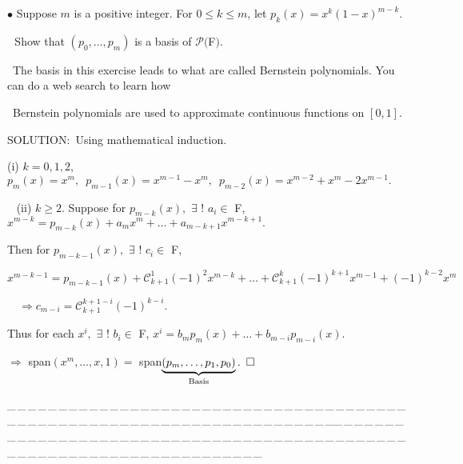 \documentclass[a4paper, 11pt, UTF8]{article}
\def\Po{\mathcal{P}}
\begin{document}
\begin{large}
{\small $\bullet$} {\timessl\Large 
Suppose $m$ is a positive integer. For $0\leq k\leq m$, let $p_k(x)=x^k(1-x)^{m-k}$.}\par\,\,
{\timessl\Large Show that $(p_0,\dots,p_m)$ is a basis of $\Po(${\timesbf F}$)$.}\par\quad\,
{\timessl\small
The basis in this exercise leads to what are called Bernstein polynomials. You can do a web search to learn how}\par\quad\,
{\timessl\small Bernstein polynomials are used to approximate continuous functions on $[0, 1]$.}\par
{\timesbf S\footnotesize{OLUTION:}}\,\,\,Using mathematical induction.\Large\par\quad
(i) $k=0,1,2$, $p_m(x)=x^m,\,\,\,p_{m-1}(x)=x^{m-1}-x^m,\,\,\,p_{m-2}(x)=x^{m-2}+x^m-2x^{m-1}.$\par\,\,\,
(ii) $k\geq 2.$ Suppose for $p_{m-k}(x),\,\,\exists\,\,!\,\,a_i\in$ {\timesbf F}, $x^{m-k}=p_{m-k}(x)+a_m x^m+\dots+a_{m-k+1}x^{m-k+1}.$\par\qquad
Then for $p_{m-k-1}(x),\,\,\exists\,\,!\,\,c_i\in$ {\timesbf F},\par\qquad\qquad
$x^{m-k-1}=p_{m-k-1}(x)+\mathcal{C}_{k+1}^1(-1)^2 x^{m-k}+\dots+\mathcal{C}_{k+1}^k(-1)^{k+1}x^{m-1}+(-1)^{k-2}x^m$\par\qquad\quad\,\,\,\,
$\Rightarrow c_{m-i}=\mathcal{C}_{k+1}^{k+1-i}(-1)^{k-i}$.\par\qquad
Thus for each $x^i,\,\,\exists\,\,!\,\,b_i\in$ {\timesbf F}, $x^i=b_m p_m(x)+\dots+b_{m-i}p_{m-i}(x)$.\par\quad
$\Rightarrow$ span$(x^m,\dots,x,1)=$ span$\underbrace{(p_m,\dots,p_1,p_0)}_\textup{Basis}.\,\,\,\square$
\par\large
{\tiny \_\,\_\,\_\,\_\,\_\,\_\,\_\,\_\,\_\,\_\,\_\,\_\,\_\,\_\,\_\,\_\,\_\,\_\,\_\,\_\,\_\,\_\,\_\,\_\,\_\,\_\,\_\,\_\,\_\,\_\,\_\,\_\,\_\,\_\,\_\,\_\,\_\,\_\,\_\,\_\,\_\,\_\,\_\,\_\,\_\,\_\,\_\,\_\,\_\,\_\,\_\,\_\,\_\,\_\,\_\,\_\,\_\,\_\,\_\,\_\,\_\,\_\,\_\,\_\,\_\,\_\,\_\,\_\,\_\,\_\,\_\_\,\_\,\_\,\_\,\_\,\_\,\_\,\_\,\_\,\_\,\_\,\_\,\_\,\_\,\_\,\_\,\_\,\_\,\_\,\_\,\_\,\_\,\_\,\_\,\_\,\_\,\_\,\_\,\_\,\_\,\_\,\_\,\_\,\_\,\_\,\_\,\_\,\_\,\_\,\_\,\_\,\_\,\_\,\_\,\_\,\_\,\_\,\_\,\_\,\_\,\_\,\_\,\_\,\_\,\_\,\_\,\_\,\_\,\_\,\_\,\_\,\_\,\_\,\_\,\_\,\_\,\_\,\_\,\_\,\_\,\_}\par


\end{large}
\end{document}
